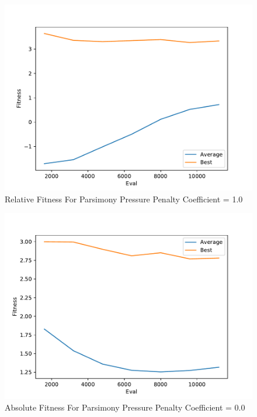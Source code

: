 \documentclass[times]{article}
\begin{document}
	\begin{figure}
		\caption{Relative Fitness For Parsimony Pressure Penalty Coefficient = 1.0}
		\label{fig:relative_plot_2}
		\includegraphics[width=\textwidth]{../graph/graphs/2.pdf}
	\end{figure}


	\begin{figure}
		\caption{Absolute Fitness For Parsimony Pressure Penalty Coefficient = 0.0}
		\label{fig:absolute_plot_0}
		\includegraphics[width=\textwidth]{../graph/absolute/0.pdf}
	\end{figure}
\end{document}
